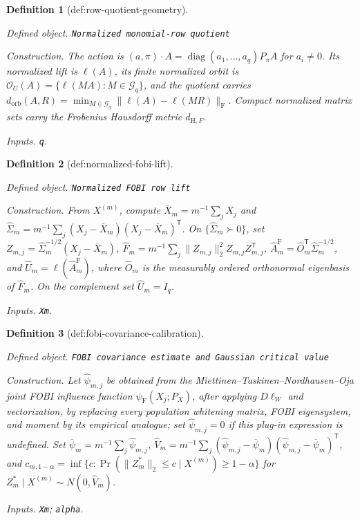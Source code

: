 \documentclass{article}
\newtheorem{definition}{Definition}
\begin{document}
\begin{definition}[def:row-quotient-geometry]\label{def:row-quotient-geometry}
\par\smallskip\noindent\emph{Defined object.} \texttt{Normalized monomial-\allowbreak{}row quotient}
\par\smallskip\noindent\emph{Construction.} The action is \((a,\pi)\cdot A=\operatorname{diag}(a_1,\ldots,a_q)P_\pi A\) for \(a_i\neq0\). Its normalized lift is \(\ell(A)\), its finite normalized orbit is \(\mathcal O_U(A)=\{\ell(MA):M\in\mathcal G_q\}\), and the quotient carries \(d_{\mathrm{orb}}(A,R)=\min_{M\in\mathcal G_q}\|\ell(A)-\ell(MR)\|_{\mathrm F}\). Compact normalized matrix sets carry the Frobenius Hausdorff metric \(d_{\mathrm H,F}\).
\par\smallskip\noindent\emph{Inputs.} \texttt{q}.
\end{definition}

\begin{definition}[def:normalized-fobi-lift]\label{def:normalized-fobi-lift}
\par\smallskip\noindent\emph{Defined object.} \texttt{Normalized FOBI row lift}
\par\smallskip\noindent\emph{Construction.} From \(X^{(m)}\), compute \(\overline X_m=m^{-1}\sum_jX_j\) and \(\widehat\Sigma_m=m^{-1}\sum_j(X_j-\overline X_m)(X_j-\overline X_m)^{\mathsf T}\). On \(\{\widehat\Sigma_m\succ0\}\), set \(Z_{m,j}=\widehat\Sigma_m^{-1/2}(X_j-\overline X_m)\), \(\widehat F_m=m^{-1}\sum_j\|Z_{m,j}\|_2^2Z_{m,j}Z_{m,j}^{\mathsf T}\), \(\widehat A_m^{\mathrm F}=\widehat O_m^{\mathsf T}\widehat\Sigma_m^{-1/2}\), and \(\widehat U_m=\ell(\widehat A_m^{\mathrm F})\), where \(\widehat O_m\) is the measurably ordered orthonormal eigenbasis of \(\widehat F_m\). On the complement set \(\widehat U_m=I_q\).
\par\smallskip\noindent\emph{Inputs.} \texttt{Xm}.
\end{definition}

\begin{definition}[def:fobi-covariance-calibration]\label{def:fobi-covariance-calibration}
\par\smallskip\noindent\emph{Defined object.} \texttt{FOBI covariance estimate and Gaussian critical value}
\par\smallskip\noindent\emph{Construction.} Let \(\widehat\psi_{m,j}\) be obtained from the Miettinen--Taskinen--Nordhausen--Oja joint FOBI influence function \(\psi_{\mathrm F}(X_j;P_X)\), after applying \(D\ell_W\) and vectorization, by replacing every population whitening matrix, FOBI eigensystem, and moment by its empirical analogue; set \(\widehat\psi_{m,j}=0\) if this plug-in expression is undefined. Set \(\overline\psi_m=m^{-1}\sum_j\widehat\psi_{m,j}\), \(\widehat V_m=m^{-1}\sum_j(\widehat\psi_{m,j}-\overline\psi_m)(\widehat\psi_{m,j}-\overline\psi_m)^{\mathsf T}\), and \(c_{m,1-\alpha}=\inf\{c:\Pr(\|Z_m^*\|_2\leq c\mid X^{(m)})\geq1-\alpha\}\) for \(Z_m^*\mid X^{(m)}\sim N(0,\widehat V_m)\).
\par\smallskip\noindent\emph{Inputs.} \texttt{Xm}; \texttt{alpha}.
\end{definition}
\end{document}
